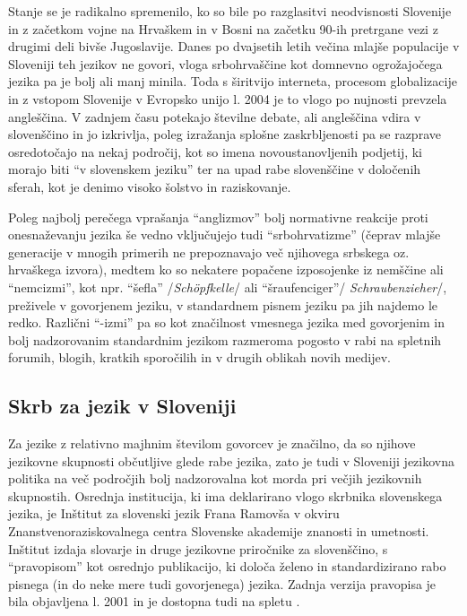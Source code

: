 \begin{multicols}{2}
Stanje se je radikalno spremenilo, ko so bile po razglasitvi neodvisnosti Slovenije in z začetkom vojne na Hrvaškem in v Bosni na začetku 90-ih pretrgane vezi z drugimi deli bivše Jugoslavije. Danes po dvajsetih letih večina mlajše populacije v Sloveniji teh jezikov ne go\-vori, vloga srbohrvaščine kot domnevno ogrožajočega jezika pa je bolj ali manj minila. Toda s širitvijo interneta, procesom globalizacije in z vstopom Slovenije v Evropsko unijo l. 2004 je to vlogo po nujnosti prevzela angleščina. V zadnjem času potekajo številne debate, ali angleščina vdira v slovenščino in jo izkrivlja, poleg izražanja splošne zaskrb\-ljenosti pa se razprave osredotočajo na nekaj področij, kot so imena novoustanov\-ljenih podjetij, ki morajo biti “v slovenskem jeziku” ter na upad rabe slovenščine v določenih sferah, kot je denimo visoko šolstvo in raziskovanje.

Poleg naj\-bolj perečega vprašanja “anglizmov” bolj normativne reakcije proti onesnaževanju jezika še vedno vključujejo tudi “srbohrvatizme” (čeprav mlajše generacije v mnogih primerih ne prepoznavajo več njihovega srbskega oz. hrvaškega izvora), medtem ko so nekatere popačene izposojenke iz nemščine ali “nemcizmi”, kot npr. “šefla” /\textit{Schöpfkelle}/ ali ``šraufenciger''/ \textit{Schraubenzieher}/, preživele v go\-vorjenem jeziku, v standardnem pisnem jeziku pa jih naj\-demo le redko. Raz\-lični “-izmi” pa so kot značilnost vmesnega jezika med go\-vorjenim in bolj nadzorovanim standardnim jezikom razmeroma pogosto v rabi na spletnih forumih, blogih, kratkih sporočilih in v drugih oblikah novih medijev.

\subsection{Skrb za jezik v Sloveniji}

Za jezike z relativno majhnim številom go\-vorcev je značilno, da so njihove jezikovne skupnosti občutljive glede rabe jezika, zato je tudi v Sloveniji jezikovna politika na več področjih bolj nadzorovalna kot morda pri večjih jezikovnih skupnostih. Osrednja institucija, ki ima deklarirano vlogo skrbnika slovenskega jezika, je Inštitut za slovenski jezik Frana Ramovša v okviru Znanstvenoraziskovalnega centra Slovenske akademije znanosti in umetnosti. Inštitut izdaja slovarje in druge jezikovne priročnike za slovenščino, s “pravopisom” kot osrednjo publikacijo, ki določa želeno in standardizirano rabo pisnega (in do neke mere tudi go\-vorjenega) jezika. Zadnja verzija pravopisa je bila objav\-ljena l. 2001 in je dostopna tudi na spletu \cite{ISJFR1}.


\end{multicols}
